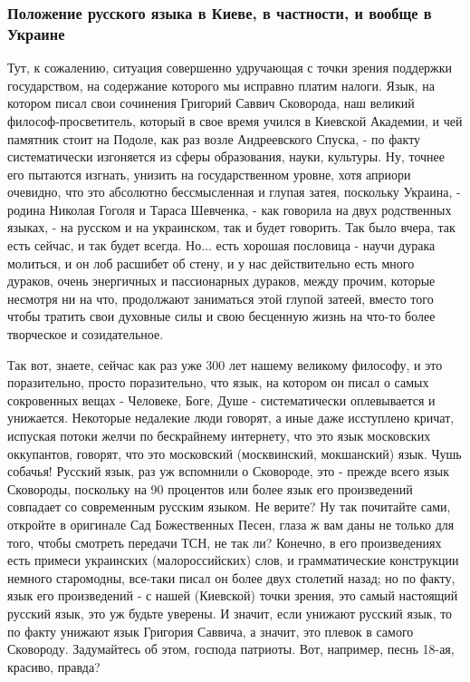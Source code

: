  
 
 
 
 

\subsubsection{Положение русского языка в Киеве, в частности, и вообще в Украине}

Тут, к сожалению, ситуация совершенно удручающая с точки зрения поддержки
государством, на содержание которого мы исправно платим налоги. Язык, на
котором писал свои сочинения Григорий Саввич Сковорода, наш великий
философ-просветитель, который в свое время учился в Киевской Академии, и чей
памятник стоит на Подоле, как раз возле Андреевского Спуска, - по факту
систематически изгоняется из сферы образования, науки, культуры. Ну, точнее его
пытаются изгнать, унизить на государственном уровне, хотя априори очевидно, что
это абсолютно бессмысленная и глупая затея, поскольку Украина, - родина Николая
Гоголя и Тараса Шевченка, - как говорила на двух родственных языках, - на
русском и на украинском, так и будет говорить. Так было вчера, так есть сейчас,
и так будет всегда. Но... есть хорошая пословица - научи дурака молиться, и он
лоб расшибет об стену, и у нас действительно есть много дураков, очень
энергичных и пассионарных дураков, между прочим, которые несмотря ни на что,
продолжают заниматься этой глупой затеей, вместо того чтобы тратить свои
духовные силы и свою бесценную жизнь на что-то более творческое и созидательное.

Так вот, знаете, сейчас как раз уже 300 лет нашему
великому философу, и это поразительно, просто поразительно, что язык, на
котором он писал о самых сокровенных вещах - Человеке, Боге, Душе -
систематически оплевывается и унижается. Некоторые недалекие люди говорят, а
иные даже исступлено кричат, испуская потоки желчи по бескрайнему интернету,
что это язык московских оккупантов, говорят, что это московский (москвинский,
мокшанский) язык. Чушь собачья! Русский язык, раз уж вспомнили о Сковороде, это
- прежде всего язык Сковороды, поскольку на 90 процентов или более язык его
произведений совпадает со современным русским языком. Не верите? Ну так
почитайте сами, откройте в оригинале Сад Божественных Песен, глаза ж вам даны
не только для того, чтобы смотреть передачи ТСН, не так ли? Конечно, в его
произведениях есть примеси украинских (малороссийских) слов, и грамматические
конструкции немного старомодны, все-таки писал он более двух столетий назад; но
по факту, язык его произведений - с нашей (Киевской) точки зрения, это самый настоящий русский язык, это уж
будьте уверены. И значит, если унижают русский язык, то по факту унижают язык
Григория Саввича, а значит, это плевок в самого Сковороду.  Задумайтесь об
этом, господа патриоты. Вот, например, песнь 18-ая, красиво, правда?

